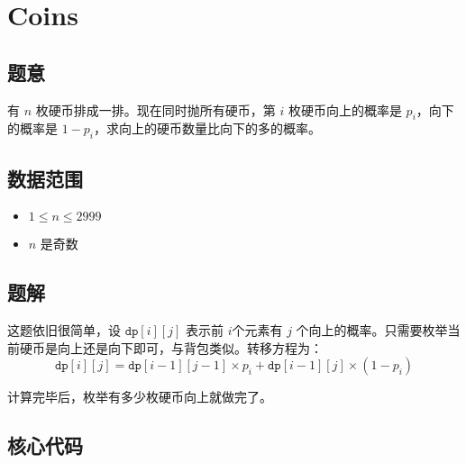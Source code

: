 \section{Coins}
\subsection*{题意}
有 $n$ 枚硬币排成一排。现在同时抛所有硬币，第 $i$ 枚硬币向上的概率是 $p_i$，向下的概率是 $1-p_i$，求向上的硬币数量比向下的多的概率。
\subsection*{数据范围}
\begin{itemize}
\item $1 \leq n \leq 2999$
\item $n$ 是奇数
\end{itemize}
\subsection*{题解}
这题依旧很简单，设 ${\texttt{dp}[i][j]}$ 表示前 $i$个元素有 $j$ 个向上的概率。只需要枚举当前硬币是向上还是向下即可，与背包类似。转移方程为：
$$
{\texttt{dp}[i][j]} = {\texttt{dp}[i-1][j-1]}\times p_i + {\texttt{dp}[i-1][j]}\times (1-p_i)
$$

计算完毕后，枚举有多少枚硬币向上就做完了。


\subsection*{核心代码}
\inputminted[linenos,autogobble]{cpp}{./Code/I.cpp}
\newpage